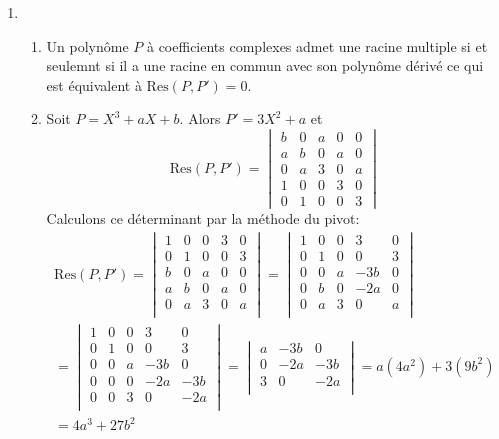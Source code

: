 \begin{enumerate}
 \item
\begin{enumerate}
 \item Un polynôme $P$ à coefficients complexes admet une racine multiple si et seulemnt si il a une racine en commun avec son polynôme dérivé ce qui est équivalent à $\text{Res}(P,P')= 0$.
 \item Soit $P=X^3+aX+b$. Alors $P'=3X^2+a$ et
\begin{displaymath}
 \text{Res}(P,P')=
\begin{vmatrix}
b & 0 & a & 0 & 0 \\
a & b & 0 & a & 0 \\
0 & a & 3 & 0 & a \\
1 & 0 & 0 & 3 & 0 \\
0 & 1 & 0 & 0 & 3 
\end{vmatrix}
\end{displaymath}
Calculons ce déterminant par la méthode du pivot:
\begin{multline*}
 \text{Res}(P,P')=
\begin{vmatrix}
1 & 0 & 0 & 3 & 0 \\
0 & 1 & 0 & 0 & 3 \\
b & 0 & a & 0 & 0 \\
a & b & 0 & a & 0 \\
0 & a & 3 & 0 & a \\
\end{vmatrix}
=
\begin{vmatrix}
1 & 0 & 0 & 3 & 0 \\
0 & 1 & 0 & 0 & 3 \\
0 & 0 & a & -3b & 0 \\
0 & b & 0 & -2a & 0 \\
0 & a & 3 & 0 & a \\
\end{vmatrix} \\
=
\begin{vmatrix}
1 & 0 & 0 & 3 & 0 \\
0 & 1 & 0 & 0 & 3 \\
0 & 0 & a & -3b & 0 \\
0 & 0 & 0 & -2a & -3b \\
0 & 0 & 3 & 0 & -2a \\
\end{vmatrix}
=
\begin{vmatrix}
 a & -3b & 0 \\
 0 & -2a & -3b \\
 3 & 0 & -2a \\
\end{vmatrix}
= a(4a^2)+3(9b^2)\\
= 4a^3+27b^2
\end{multline*}
\end{enumerate}

\end{enumerate}


